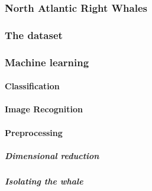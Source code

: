 \subsubsection{North Atlantic Right Whales}

\subsubsection{The dataset}


\subsubsection{Machine learning}
\paragraph{Classification}

\paragraph{Image Recognition}

\paragraph{Preprocessing}
\subparagraph{Dimensional reduction}
\subparagraph{Isolating the whale}
